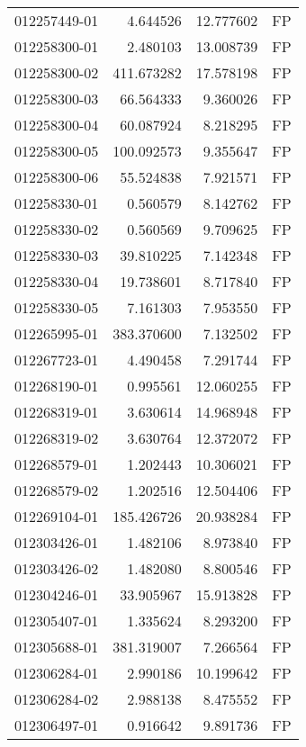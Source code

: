 \begin{tabular}{lrrl}
012257449-01 &    4.644526 &      12.777602 &   FP \\
012258300-01 &    2.480103 &      13.008739 &   FP \\
012258300-02 &  411.673282 &      17.578198 &   FP \\
012258300-03 &   66.564333 &       9.360026 &   FP \\
012258300-04 &   60.087924 &       8.218295 &   FP \\
012258300-05 &  100.092573 &       9.355647 &   FP \\
012258300-06 &   55.524838 &       7.921571 &   FP \\
012258330-01 &    0.560579 &       8.142762 &   FP \\
012258330-02 &    0.560569 &       9.709625 &   FP \\
012258330-03 &   39.810225 &       7.142348 &   FP \\
012258330-04 &   19.738601 &       8.717840 &   FP \\
012258330-05 &    7.161303 &       7.953550 &   FP \\
012265995-01 &  383.370600 &       7.132502 &   FP \\
012267723-01 &    4.490458 &       7.291744 &   FP \\
012268190-01 &    0.995561 &      12.060255 &   FP \\
012268319-01 &    3.630614 &      14.968948 &   FP \\
012268319-02 &    3.630764 &      12.372072 &   FP \\
012268579-01 &    1.202443 &      10.306021 &   FP \\
012268579-02 &    1.202516 &      12.504406 &   FP \\
012269104-01 &  185.426726 &      20.938284 &   FP \\
012303426-01 &    1.482106 &       8.973840 &   FP \\
012303426-02 &    1.482080 &       8.800546 &   FP \\
012304246-01 &   33.905967 &      15.913828 &   FP \\
012305407-01 &    1.335624 &       8.293200 &   FP \\
012305688-01 &  381.319007 &       7.266564 &   FP \\
012306284-01 &    2.990186 &      10.199642 &   FP \\
012306284-02 &    2.988138 &       8.475552 &   FP \\
012306497-01 &    0.916642 &       9.891736 &   FP \\

\end{tabular}
